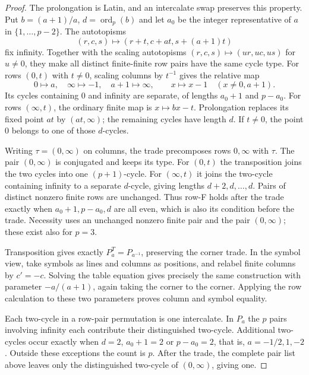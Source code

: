 \begin{proof}
The prolongation is Latin, and an intercalate swap preserves this property.
Put $b=(a+1)/a$, $d=\operatorname{ord}_p(b)$ and let $a_0$ be the
integer representative of $a$ in $\{1,\ldots,p-2\}$. The autotopisms
\[
 (r,c,s)\longmapsto(r+t,c+at,s+(a+1)t)
\]
fix infinity. Together with the scaling autotopisms
$(r,c,s)\mapsto(ur,uc,us)$ for $u\ne0$, they make all distinct
finite-finite row pairs have the same cycle type. For rows $(0,t)$
with $t\ne0$, scaling columns by
$t^{-1}$ gives the relative map
\[
 0\mapsto a,\quad \infty\mapsto-1,\quad a+1\mapsto\infty,
 \qquad x\mapsto x-1\quad(x\ne0,a+1).
\]
Its cycles containing $0$ and infinity are separate, of lengths
$a_0+1$ and $p-a_0$. For rows $(\infty,t)$, the ordinary finite
map is $x\mapsto bx-t$. Prolongation replaces its fixed point $at$
by $(at,\infty)$; the remaining cycles have length $d$. If $t\ne0$,
the point $0$ belongs to one of those $d$-cycles.

Writing $\tau=(0,\infty)$ on columns, the trade precomposes rows
$0,\infty$ with $\tau$. The pair $(0,\infty)$ is conjugated and
keeps its type. For $(0,t)$ the transposition joins the two cycles
into one $(p+1)$-cycle. For $(\infty,t)$ it joins the two-cycle
containing infinity to a separate $d$-cycle, giving lengths
$d+2,d,\ldots,d$. Pairs of distinct nonzero finite rows are unchanged.
Thus row-F holds after the trade exactly when $a_0+1,p-a_0,d$ are
all even, which is also its condition before the trade. Necessity
uses an unchanged nonzero finite pair and the pair $(0,\infty)$;
these exist also for $p=3$.

Transposition gives exactly $P_a^T=P_{a^{-1}}$, preserving the
corner trade. In the symbol view, take symbols as lines and columns
as positions, and relabel finite columns by $c'=-c$. Solving the
table equation gives precisely the same construction with parameter
$-a/(a+1)$, again taking the corner to the corner. Applying the row
calculation to these two parameters proves column and symbol equality.

Each two-cycle in a row-pair permutation is one intercalate. In $P_a$
the $p$ pairs involving infinity each contribute their distinguished
two-cycle. Additional two-cycles occur exactly when $d=2$, $a_0+1=2$
or $p-a_0=2$, that is, $a=-1/2,1,-2$. Outside these exceptions
the count is $p$. After the trade, the complete pair list above
leaves only the distinguished two-cycle of $(0,\infty)$, giving one.
\end{proof}

